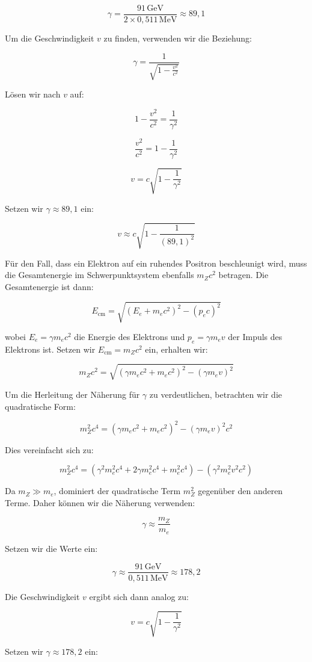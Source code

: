 \documentclass[11pt,a4paper]{article}
\begin{document}
\[
\gamma = \frac{91 \, \text{GeV}}{2 \times 0{,}511 \, \text{MeV}} \approx 89{,}1
\]

Um die Geschwindigkeit \( v \) zu finden, verwenden wir die Beziehung:

\[
\gamma = \frac{1}{\sqrt{1 - \frac{v^2}{c^2}}}
\]

Lösen wir nach \( v \) auf:

\[
1 - \frac{v^2}{c^2} = \frac{1}{\gamma^2}
\]

\[
\frac{v^2}{c^2} = 1 - \frac{1}{\gamma^2}
\]

\[
v = c \sqrt{1 - \frac{1}{\gamma^2}}
\]

Setzen wir \( \gamma \approx 89{,}1 \) ein:

\[
v \approx c \sqrt{1 - \frac{1}{(89{,}1)^2}}
\]

Für den Fall, dass ein Elektron auf ein ruhendes Positron beschleunigt wird, muss die Gesamtenergie im Schwerpunktsystem ebenfalls \( m_Z c^2 \) betragen. Die Gesamtenergie ist dann:

\[
E_{\text{cm}} = \sqrt{(E_e + m_e c^2)^2 - (p_e c)^2}
\]

wobei \( E_e = \gamma m_e c^2 \) die Energie des Elektrons und \( p_e = \gamma m_e v \) der Impuls des Elektrons ist. Setzen wir \( E_{\text{cm}} = m_Z c^2 \) ein, erhalten wir:

\[
m_Z c^2 = \sqrt{(\gamma m_e c^2 + m_e c^2)^2 - (\gamma m_e v)^2}
\]

Um die Herleitung der Näherung für \( \gamma \) zu verdeutlichen, betrachten wir die quadratische Form:

\[
m_Z^2 c^4 = (\gamma m_e c^2 + m_e c^2)^2 - (\gamma m_e v)^2 c^2
\]

Dies vereinfacht sich zu:

\[
m_Z^2 c^4 = (\gamma^2 m_e^2 c^4 + 2 \gamma m_e^2 c^4 + m_e^2 c^4) - (\gamma^2 m_e^2 v^2 c^2)
\]

Da \( m_Z \gg m_e \), dominiert der quadratische Term \( m_Z^2 \) gegenüber den anderen Terme. Daher können wir die Näherung verwenden:

\[
\gamma \approx \frac{m_Z}{m_e}
\]

Setzen wir die Werte ein:

\[
\gamma \approx \frac{91 \, \text{GeV}}{0{,}511 \, \text{MeV}} \approx 178{,}2
\]

Die Geschwindigkeit \( v \) ergibt sich dann analog zu:

\[
v = c \sqrt{1 - \frac{1}{\gamma^2}}
\]

Setzen wir \( \gamma \approx 178{,}2 \) ein:
\end{document}
